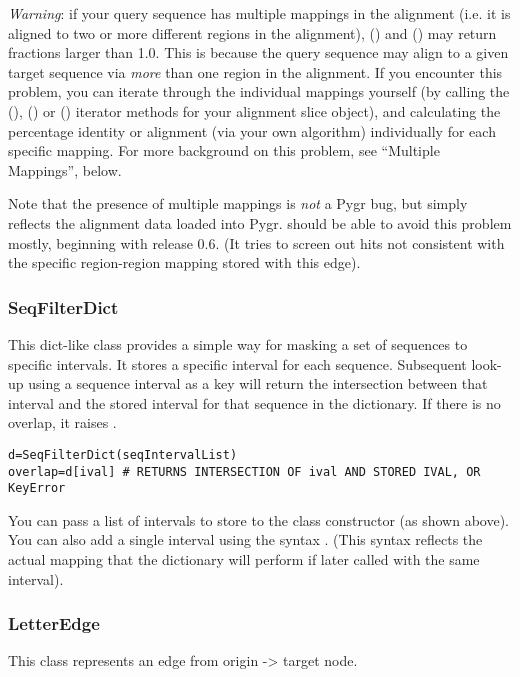 \documentclass{howto}
\begin{document}
{\em Warning}: if your query sequence has multiple mappings in the alignment
(i.e. it is aligned to two or more different regions in the alignment),
() and () may return fractions larger
than 1.0.  This is because the query sequence may align to a given
target sequence via {\em more} than one region in the alignment.  If you
encounter this problem, you can iterate through the individual mappings
yourself (by calling the (), () or
() iterator methods for your alignment slice object), 
and calculating the percentage identity or alignment (via your own algorithm)
individually for each specific mapping.  For more
background on this problem, see ``Multiple Mappings'', below.

Note that the presence of multiple mappings is {\em not} a Pygr bug,
but simply reflects the alignment data loaded into Pygr.  
should be able to avoid this problem mostly, beginning with release 0.6.
(It tries to screen out hits not consistent with the specific region-region
mapping stored with this edge).

\subsubsection{SeqFilterDict}
This dict-like class provides a simple way for masking a set of sequences
to specific intervals.  It stores a specific interval for each
sequence.  Subsequent look-up using a sequence interval as a key will
return the intersection between that interval and the stored interval
for that sequence in the dictionary.  If there is no overlap, it
raises .

\begin{verbatim}
d=SeqFilterDict(seqIntervalList)
overlap=d[ival] # RETURNS INTERSECTION OF ival AND STORED IVAL, OR KeyError
\end{verbatim}

You can pass a list of intervals to store to the class constructor (as 
shown above).  You can also add a single interval using the syntax
.  (This syntax reflects the actual
mapping that the dictionary will perform if later called with the
same interval).

\subsubsection{LetterEdge}
This class represents an edge from origin -> target node.
\end{document}
